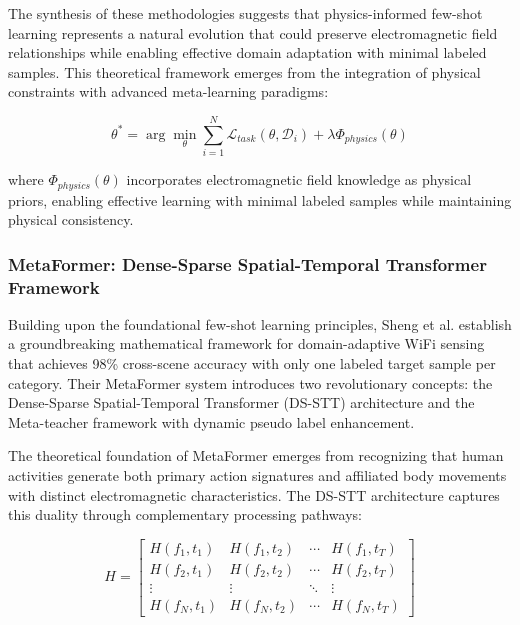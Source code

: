 \documentclass[journal]{IEEEtran}
\begin{document}
The synthesis of these methodologies suggests that physics-informed few-shot learning represents a natural evolution that could preserve electromagnetic field relationships while enabling effective domain adaptation with minimal labeled samples. This theoretical framework emerges from the integration of physical constraints with advanced meta-learning paradigms:

\begin{equation}
\theta^* = \arg\min_{\theta} \sum_{i=1}^{N} \mathcal{L}_{task}(\theta, \mathcal{D}_i) + \lambda \Phi_{physics}(\theta)
\label{eq:few_shot_physics}
\end{equation}

where $\Phi_{physics}(\theta)$ incorporates electromagnetic field knowledge as physical priors, enabling effective learning with minimal labeled samples while maintaining physical consistency.

\subsubsection{MetaFormer: Dense-Sparse Spatial-Temporal Transformer Framework}

Building upon the foundational few-shot learning principles, Sheng et al. \cite{sheng2024metaformer} establish a groundbreaking mathematical framework for domain-adaptive WiFi sensing that achieves 98\% cross-scene accuracy with only one labeled target sample per category. Their MetaFormer system introduces two revolutionary concepts: the Dense-Sparse Spatial-Temporal Transformer (DS-STT) architecture and the Meta-teacher framework with dynamic pseudo label enhancement.

The theoretical foundation of MetaFormer emerges from recognizing that human activities generate both primary action signatures and affiliated body movements with distinct electromagnetic characteristics. The DS-STT architecture captures this duality through complementary processing pathways:

\begin{equation}
H = \begin{bmatrix}
H(f_1,t_1) & H(f_1,t_2) & \cdots & H(f_1,t_T) \\
H(f_2,t_1) & H(f_2,t_2) & \cdots & H(f_2,t_T) \\
\vdots & \vdots & \ddots & \vdots \\
H(f_N,t_1) & H(f_N,t_2) & \cdots & H(f_N,t_T)
\end{bmatrix}
\label{eq:metaformer_csi_matrix}
\end{equation}
\end{document}
